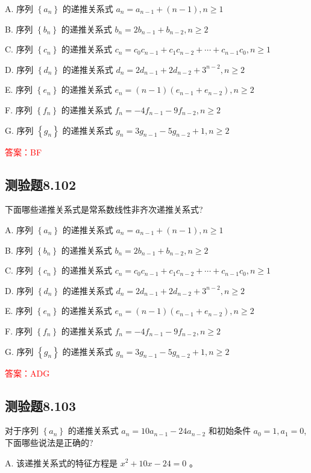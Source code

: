 \documentclass[UTF8, heading=true]{ctexart}
\begin{document}
A. 序列 $\left\{a_n\right\}$ 的递推关系式 $a_n=a_{n-1}+(n-1),  n \geq 1$

B. 序列 $\left\{b_n\right\}$ 的递推关系式 $b_n=2 b_{n-1}+b_{n-2},  n \geq 2$

C. 序列 $\left\{c_n\right\}$ 的递推关系式 $c_n=c_0 c_{n-1}+c_1 c_{n-2}+\cdots+c_{n-1} c_0,  n \geq 1$

D. 序列 $\left\{d_n\right\}$ 的递推关系式 $d_n=2 d_{n-1}+2 d_{n-2}+3^{n-2},  n \geq 2$

E. 序列 $\left\{e_n\right\}$ 的递推关系式 $e_n=(n-1)\left(e_{n-1}+e_{n-2}\right),  n \geq 2$

F. 序列 $\left\{f_n\right\}$ 的递推关系式 $f_n=-4 f_{n-1}-9 f_{n-2},  n \geq 2$

G. 序列 $\left\{g_n\right\}$ 的递推关系式 $g_n=3 g_{n-1}-5 g_{n-2}+1, n \geq 2$

\textcolor{red}{答案：BF}

\subsection{测验题8.102}

下面哪些递推关系式是常系数线性非齐次递推关系式?

A. 
序列 $\left\{a_n\right\}$ 的递推关系式 $a_n=a_{n-1}+(n-1), n \geq 1$

B. 
序列 $\left\{b_n\right\}$ 的递推关系式 $b_n=2 b_{n-1}+b_{n-2}, n \geq 2$

C. 
序列 $\left\{c_n\right\}$ 的递推关系式 $c_n=c_0 c_{n-1}+c_1 c_{n-2}+\cdots+c_{n-1} c_0, n \geq 1$

D. 
序列 $\left\{d_n\right\}$ 的递推关系式 $d_n=2 d_{n-1}+2 d_{n-2}+3^{n-2}, n \geq 2$

E. 
序列 $\left\{e_n\right\}$ 的递推关系式 $e_n=(n-1)\left(e_{n-1}+e_{n-2}\right), n \geq 2$

F.
序列 $\left\{f_n\right\}$ 的递推关系式 $f_n=-4 f_{n-1}-9 f_{n-2}, n \geq 2$

G.
序列 $\left\{g_n\right\}$ 的递推关系式 $g_n=3 g_{n-1}-5 g_{n-2}+1, n \geq 2$

\textcolor{red}{答案：ADG}

\subsection{测验题8.103}

对于序列 $\left\{a_n\right\}$ 的递推关系式 $a_n=10 a_{n-1}-24 a_{n-2}$ 和初始条件 $a_0=1, a_1=0$, 下面哪些说法是正确的?

A. 
该递推关系式的特征方程是 $x^2+10 x-24=0$ 。
\end{document}
